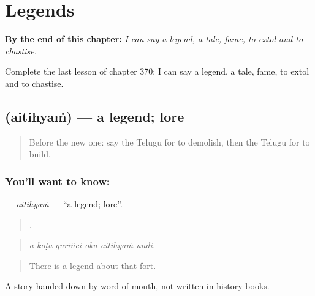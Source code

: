 
\chapter{Legends}
\label{ch:te-legends}

\begin{chapteropening}
\textbf{By the end of this chapter:} \emph{I can say a legend, a tale, fame, to extol and to chastise.}

Complete the last lesson of chapter 370: I can say a legend, a tale, fame, to extol and to chastise.
\end{chapteropening}

\section[\texorpdfstring{\te{ఐతిహ్యం} (aitihyaṁ)}{ఐతిహ్యం (aitihyaṁ)}]{ (aitihyaṁ) — a legend; lore}

\label{lesson:TE-C370-aitihyam}



\begin{quote}
Before the new one: say the Telugu for to demolish, then the Telugu for to build.
\end{quote}

\subsection*{You'll want to know: }
\textbf{} — \emph{aitihyaṁ} — \textquotedblleft{}a legend; lore\textquotedblright{}.

\begin{quote}
     .
\end{quote}

\begin{quote}
\emph{ā kōṭa guriñci oka aitihyaṁ undi.}
\end{quote}

\begin{quote}
There is a legend about that fort.
\end{quote}

A story handed down by word of mouth, not written in history books.

